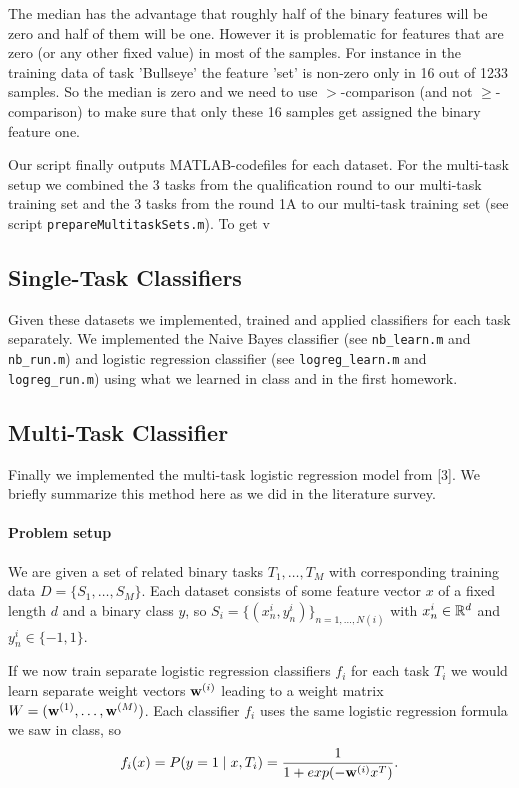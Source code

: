 The median has the advantage that roughly half of the binary features will be zero and half of them will be one. 
However it is problematic for features that are zero (or any other fixed value) in most of the samples. For instance  in the training data of task 'Bullseye' the feature 'set' is non-zero only in 16 out of 1233 samples. So the median is zero and we need to use $>$-comparison (and not $\geq$-comparison) to make sure that only these 16 samples get assigned the binary feature one.

Our script finally outputs MATLAB-codefiles for each dataset. For the multi-task setup we combined the 3 tasks from the qualification round to our multi-task training set and the 3 tasks from the round 1A to our multi-task training set (see script \texttt{prepareMultitaskSets.m}). To get v

\subsection*{Single-Task Classifiers}
Given these datasets we implemented, trained and applied classifiers for each task separately.
We implemented the Naive Bayes classifier (see \texttt{nb\_learn.m} and \texttt{nb\_run.m}) and logistic regression classifier (see \texttt{logreg\_learn.m} and \texttt{logreg\_run.m}) using what we learned in class and in the first homework.

\subsection*{Multi-Task Classifier}
Finally we implemented the multi-task logistic regression model from [3]. We briefly summarize this method here as we did in the literature survey.

\paragraph{Problem setup}
We are given a set of related binary tasks $T_1, \dots, T_M$ with corresponding training data $D = \{S_1, \dots, S_M\}$. Each dataset consists of some feature vector $x$ of a fixed length $d$ and a binary class $y$, so $S_i = \{(x_n^i, y_n^i)\}_{n=1,\dots,N(i)}$ with $x_n^i \in \mathbb{R}^d$ and $y_n^i \in \{-1,1\}$.

If we now train separate logistic regression classifiers $f_i$ for each task $T_i$ we would learn separate weight vectors $\textbf{w}^{(i)}$ leading to a weight matrix $W = (\textbf{w}^{(1)}, \dots, \textbf{w}^{(M)})$. Each classifier $f_i$ uses the same logistic regression formula we saw in class, so
\begin{align*}
f_i(x) = P(y=1 \mid x, T_i) = \frac{1}{1+exp(-\textbf{w}^{(i)} x^T)}.
\end{align*}

